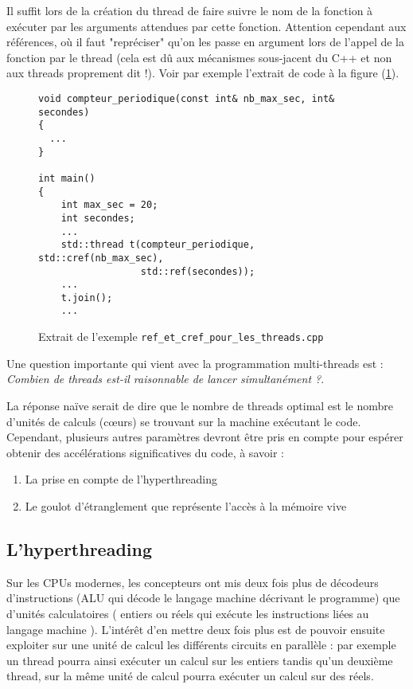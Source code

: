 \documentclass[fleqn,11pt]{article}
\begin{document}
Il suffit lors de la création du thread de faire suivre le nom de la fonction à exécuter par les arguments
attendues par cette fonction. Attention cependant aux références, où il faut "repréciser" qu'on les passe
en argument lors de l'appel de la fonction par le thread (cela est dû aux mécanismes sous-jacent du C++
et non aux threads proprement dit !). Voir par exemple l'extrait de code à la figure (\ref{lst::ref_et_cref}).

\begin{figure}[ht]
\begin{lstlisting}
void compteur_periodique(const int& nb_max_sec, int& secondes)
{
  ...
}

int main()
{
    int max_sec = 20;
    int secondes;
    ...
    std::thread t(compteur_periodique, std::cref(nb_max_sec), 
                  std::ref(secondes));
    ...
    t.join();
    ...
\end{lstlisting}
\caption{Extrait de l'exemple \texttt{ref\_et\_cref\_pour\_les\_threads.cpp}}
\label{lst::ref_et_cref}
\end{figure}

Une question importante qui vient avec la programmation multi-threads est : \textsl{Combien de threads est-il raisonnable de lancer simultanément ?}.

La réponse naïve serait de dire que le nombre de threads optimal est le nombre d'unités de calculs (c{\oe}urs) se trouvant sur la machine exécutant le code. Cependant, plusieurs autres paramètres devront être pris en compte pour espérer obtenir des accélérations significatives du code, à savoir :
\begin{enumerate}
  \item La prise en compte de l'hyperthreading
  \item Le goulot d'étranglement que représente l'accès à la mémoire vive
\end{enumerate}

\subsection{L'hyperthreading}


Sur les CPUs modernes, les concepteurs ont mis deux fois plus de décodeurs d'instructions
(ALU qui décode le langage machine décrivant le programme) que d'unités calculatoires ( entiers ou réels qui exécute les instructions liées au langage machine ). L'intérêt d'en mettre deux fois plus est
de pouvoir ensuite exploiter sur une unité de calcul les différents circuits en parallèle : par exemple
un thread pourra ainsi exécuter un calcul sur les entiers tandis qu'un deuxième thread, sur la même unité
de calcul pourra exécuter un calcul sur des réels.
\end{document}
